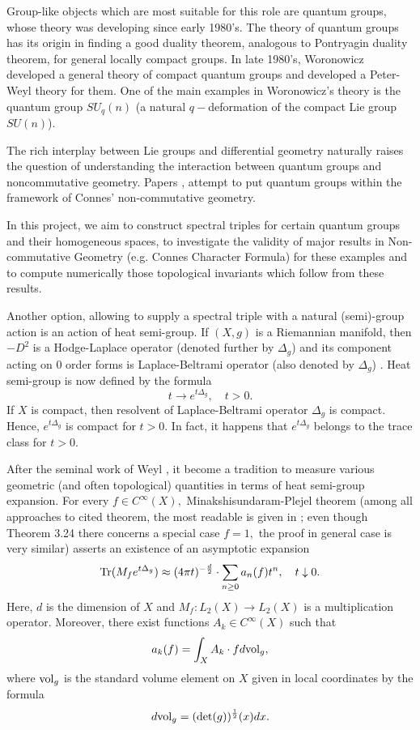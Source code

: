 \documentclass{article}
\begin{document}
Group-like objects which are most suitable for this role are quantum groups, whose theory was developing since early 1980's. The theory of quantum groups has its origin in finding a good duality theorem, analogous to Pontryagin duality theorem, for general locally compact groups. In late 1980's, Woronowicz developed a general theory of compact quantum groups and developed a Peter-Weyl theory for them. One of the main examples in Woronowicz’s theory is the quantum group $SU_q(n)$ (a natural $q-$deformation of the compact Lie group $SU(n)$). 

The rich interplay between Lie groups and differential geometry naturally raises the question of understanding the interaction between quantum groups and noncommutative geometry. Papers \cite{ChakrabortyPal}, \cite{NeshTus} attempt to put quantum groups within the framework of Connes’ non-commutative geometry.

In this project, we aim to construct spectral triples for certain quantum groups and their homogeneous spaces, to investigate the validity of major results in Non-commutative Geometry (e.g. Connes Character Formula) for these examples and to compute numerically those topological invariants which follow from these results.

Another option, allowing to supply a spectral triple with a natural (semi)-group action is an action of heat semi-group. If $(X,g)$ is a Riemannian manifold, then $-D^2$ is a Hodge-Laplace operator (denoted further by $\Delta_g$) and its component acting on $0$ order forms is Laplace-Beltrami operator (also denoted by $\Delta_g$) \cite{Rosenberg}. Heat semi-group is now defined by the formula
$$t\to e^{t\Delta_g},\quad t>0.$$
If $X$ is compact, then resolvent of Laplace-Beltrami operator $\Delta_g$ is compact. Hence, $e^{t\Delta_g}$ is compact for $t>0.$ In fact, it happens that $e^{t\Delta_g}$ belongs to the trace class for $t>0.$

After the seminal work of Weyl \cite{Weyl}, it become a tradition to measure various geometric (and often topological) quantities in terms of heat semi-group expansion. For every $f\in C^{\infty}(X),$ Minakshisundaram-Plejel theorem (among all approaches to cited theorem, the most readable is given in \cite{Rosenberg}; even though Theorem 3.24 there concerns a special case $f=1,$ the proof in general case is very similar) \cite{Rosenberg} asserts an existence of an asymptotic expansion 
\begin{equation}\label{heat asymptotic}
{\rm Tr}(M_fe^{t\Delta_g})\approx (4\pi t)^{-\frac{d}{2}}\cdot \sum_{n\geq0}a_n(f)t^n,\quad t\downarrow0.
\end{equation}
Here, $d$ is the dimension of $X$ and $M_f:L_2(X)\to L_2(X)$ is a multiplication operator. Moreover, there exist functions $A_k\in C^{\infty}(X)$ such that
\begin{equation}\label{normality of coefficients}
a_k(f)=\int_X A_k\cdot f d{\rm vol}_g,
\end{equation}
where ${\rm vol}_g$ is the standard volume element on $X$ given in local coordinates by the formula
$$d{\rm vol}_g=({\rm det}(g))^{\frac12}(x)dx.$$
\end{document}
